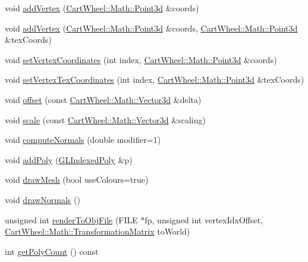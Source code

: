 \begin{DoxyCompactItemize}
\item 
void \hyperlink{classCartWheel_1_1GL_1_1GLMesh_a8709123720c14b00a4bc5399e3652f53}{addVertex} (\hyperlink{classCartWheel_1_1Math_1_1Point3d}{CartWheel::Math::Point3d} \&coords)
\item 
void \hyperlink{classCartWheel_1_1GL_1_1GLMesh_ac3a63d6116a6987a92e3d93fe8503917}{addVertex} (\hyperlink{classCartWheel_1_1Math_1_1Point3d}{CartWheel::Math::Point3d} \&coords, \hyperlink{classCartWheel_1_1Math_1_1Point3d}{CartWheel::Math::Point3d} \&texCoords)
\item 
void \hyperlink{classCartWheel_1_1GL_1_1GLMesh_a0c19ba9f7d8c236eef920ff8c6ef70e4}{setVertexCoordinates} (int index, \hyperlink{classCartWheel_1_1Math_1_1Point3d}{CartWheel::Math::Point3d} \&coords)
\item 
void \hyperlink{classCartWheel_1_1GL_1_1GLMesh_ae0fbe2fed3988a3ac01783de3db873ce}{setVertexTexCoordinates} (int index, \hyperlink{classCartWheel_1_1Math_1_1Point3d}{CartWheel::Math::Point3d} \&texCoords)
\item 
void \hyperlink{classCartWheel_1_1GL_1_1GLMesh_a596ecf6cf2ece6422ac23d638170e730}{offset} (const \hyperlink{classCartWheel_1_1Math_1_1Vector3d}{CartWheel::Math::Vector3d} \&delta)
\item 
void \hyperlink{classCartWheel_1_1GL_1_1GLMesh_a7e4f0e6b6c3e2979f614104c35e52465}{scale} (const \hyperlink{classCartWheel_1_1Math_1_1Vector3d}{CartWheel::Math::Vector3d} \&scaling)
\item 
void \hyperlink{classCartWheel_1_1GL_1_1GLMesh_aba8350867124ed15f083199dbd30e09e}{computeNormals} (double modifier=1)
\item 
void \hyperlink{classCartWheel_1_1GL_1_1GLMesh_a5076ff11c481e5105a6ef89931a4c2ee}{addPoly} (\hyperlink{classCartWheel_1_1GL_1_1GLIndexedPoly}{GLIndexedPoly} \&p)
\item 
void \hyperlink{classCartWheel_1_1GL_1_1GLMesh_a1ea5895a893f95a5c540b0f63bc8fd8c}{drawMesh} (bool useColours=true)
\item 
void \hyperlink{classCartWheel_1_1GL_1_1GLMesh_ab2a3b84bab3f14733d68da4df2a25e63}{drawNormals} ()
\item 
unsigned int \hyperlink{classCartWheel_1_1GL_1_1GLMesh_acb6381163d3348f0983b35b4defb6449}{renderToObjFile} (FILE $\ast$fp, unsigned int vertexIdxOffset, \hyperlink{classCartWheel_1_1Math_1_1TransformationMatrix}{CartWheel::Math::TransformationMatrix} toWorld)
\item 
int \hyperlink{classCartWheel_1_1GL_1_1GLMesh_aafcc4fe6b300ff7c7492c75a057710b2}{getPolyCount} () const 

\end{DoxyCompactItemize}
